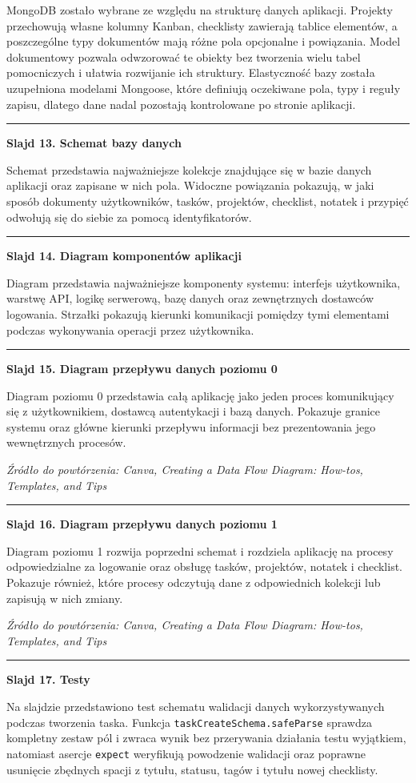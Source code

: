 \documentclass[12pt,a4paper]{article}
\newif\iffirstslide
\newcommand{\Slide}[2]{%
  \iffirstslide
    \global\firstslidefalse
  \else
    \par\vspace{1.5\baselineskip}%
    \noindent\rule{\textwidth}{0.8pt}%
    \par\vspace{1.5\baselineskip}%
  \fi
  {\LARGE\bfseries Slajd #1. #2\par}%
  \vspace{2\baselineskip}%
}
\newcommand{\Source}[1]{%
  \par\vspace{0.5\baselineskip}%
  {\small\itshape Źródło do powtórzenia: #1\par}%
}
\begin{document}
MongoDB zostało wybrane ze względu na strukturę danych aplikacji. Projekty przechowują własne kolumny Kanban, checklisty zawierają tablice elementów, a poszczególne typy dokumentów mają różne pola opcjonalne i powiązania. Model dokumentowy pozwala odwzorować te obiekty bez tworzenia wielu tabel pomocniczych i ułatwia rozwijanie ich struktury. Elastyczność bazy została uzupełniona modelami Mongoose, które definiują oczekiwane pola, typy i reguły zapisu, dlatego dane nadal pozostają kontrolowane po stronie aplikacji.

\Slide{13}{Schemat bazy danych}

Schemat przedstawia najważniejsze kolekcje znajdujące się w bazie danych aplikacji oraz zapisane w nich pola. Widoczne powiązania pokazują, w jaki sposób dokumenty użytkowników, tasków, projektów, checklist, notatek i przypięć odwołują się do siebie za pomocą identyfikatorów.

\Slide{14}{Diagram komponentów aplikacji}

Diagram przedstawia najważniejsze komponenty systemu: interfejs użytkownika, warstwę API, logikę serwerową, bazę danych oraz zewnętrznych dostawców logowania. Strzałki pokazują kierunki komunikacji pomiędzy tymi elementami podczas wykonywania operacji przez użytkownika.

\Slide{15}{Diagram przepływu danych poziomu 0}

Diagram poziomu 0 przedstawia całą aplikację jako jeden proces komunikujący się z użytkownikiem, dostawcą autentykacji i bazą danych. Pokazuje granice systemu oraz główne kierunki przepływu informacji bez prezentowania jego wewnętrznych procesów.

\Source{Canva, \emph{Creating a Data Flow Diagram: How-tos, Templates, and Tips}}

\Slide{16}{Diagram przepływu danych poziomu 1}

Diagram poziomu 1 rozwija poprzedni schemat i rozdziela aplikację na procesy odpowiedzialne za logowanie oraz obsługę tasków, projektów, notatek i checklist. Pokazuje również, które procesy odczytują dane z odpowiednich kolekcji lub zapisują w nich zmiany.

\Source{Canva, \emph{Creating a Data Flow Diagram: How-tos, Templates, and Tips}}

\Slide{17}{Testy}

Na slajdzie przedstawiono test schematu walidacji danych wykorzystywanych podczas tworzenia taska. Funkcja \nolinkurl{taskCreateSchema.safeParse} sprawdza kompletny zestaw pól i zwraca wynik bez przerywania działania testu wyjątkiem, natomiast asercje \texttt{expect} weryfikują powodzenie walidacji oraz poprawne usunięcie zbędnych spacji z tytułu, statusu, tagów i tytułu nowej checklisty.
\end{document}

